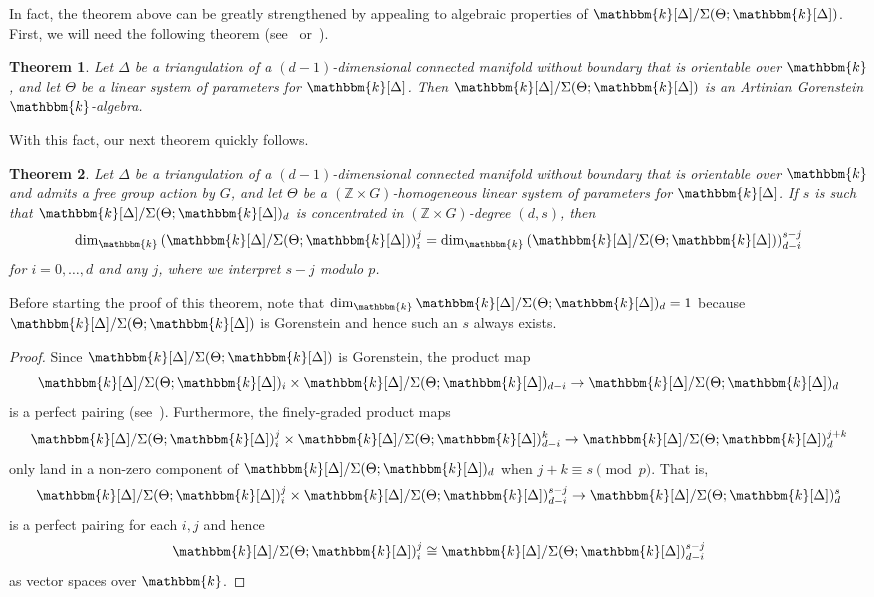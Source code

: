 \documentclass[10pt]{amsart}
\newtheorem{theo}{Theorem}[section]
\theoremstyle{definition}
\newcommand{\field}{\mathbbm{k}}
\newcommand{\ZZ}{{\mathbb Z}}
\begin{document}
In fact, the theorem above can be greatly strengthened by appealing to algebraic properties of $\field[\Delta]/\Sigma(\Theta;\field[\Delta])$. First, we will need the following theorem (see~\cite[Theorem~1.4]{NS-Gorenstein} or~\cite[Remark~3.8]{BBMD}).

\begin{theo}
Let $\Delta$ be a triangulation of a $(d-1)$-dimensional connected manifold without boundary that is orientable over $\field$, and let $\Theta$ be a linear system of parameters for $\field[\Delta]$. Then $\field[\Delta]/\Sigma(\Theta;\field[\Delta])$ is an Artinian Gorenstein $\field$-algebra.
\end{theo}

With this fact, our next theorem quickly follows.

\begin{theo}\label{DSTheorem2}
Let $\Delta$ be a triangulation of a $(d-1)$-dimensional connected manifold without boundary that is orientable over $\field$ and admits a free group action by $G$, and let $\Theta$ be a $(\ZZ\times G)$-homogeneous linear system of parameters for $\field[\Delta]$. If $s$ is such that $\field[\Delta]/\Sigma(\Theta;\field[\Delta])_d$ is concentrated in $(\ZZ\times G)$-degree $(d, s)$, then
\[
\dim_\field \left(\field[\Delta]/\Sigma(\Theta;\field[\Delta])\right)_i^j = \dim_\field \left(\field[\Delta]/\Sigma(\Theta;\field[\Delta])\right)_{d-i}^{s-j}
\]
for $i=0, \ldots, d$ and any $j$, where we interpret $s-j$ modulo $p$.
\end{theo}

Before starting the proof of this theorem, note that $\dim_{\field}\field[\Delta]/\Sigma(\Theta;\field[\Delta])_d=1$ because $\field[\Delta]/\Sigma(\Theta;\field[\Delta])$ is Gorenstein and hence such an $s$ always exists.

\begin{proof}
Since $\field[\Delta]/\Sigma(\Theta;\field[\Delta])$ is Gorenstein, the product map
\[
\field[\Delta]/\Sigma(\Theta;\field[\Delta])_i \times \field[\Delta]/\Sigma(\Theta;\field[\Delta])_{d-i} \to \field[\Delta]/\Sigma(\Theta;\field[\Delta])_d
\]
is a perfect pairing (see~\cite[Theorem~2.79]{LefschetzProperties}). Furthermore, the finely-graded product maps
\[
\field[\Delta]/\Sigma(\Theta;\field[\Delta])_i^j \times \field[\Delta]/\Sigma(\Theta;\field[\Delta])_{d-i}^k \to \field[\Delta]/\Sigma(\Theta;\field[\Delta])_d^{j+k}
\]
only land in a non-zero component of $\field[\Delta]/\Sigma(\Theta;\field[\Delta])_d$ when $j+k\equiv s \pmod p$. That is,
\[
\field[\Delta]/\Sigma(\Theta;\field[\Delta])_i^j \times \field[\Delta]/\Sigma(\Theta;\field[\Delta])_{d-i}^{s-j} \to \field[\Delta]/\Sigma(\Theta;\field[\Delta])_d^{s}
\]
is a perfect pairing for each $i, j$ and hence
\[
\field[\Delta]/\Sigma(\Theta;\field[\Delta])_i^j \cong \field[\Delta]/\Sigma(\Theta;\field[\Delta])_{d-i}^{s-j}
\]
as vector spaces over $\field$.
\end{proof}
\end{document}
